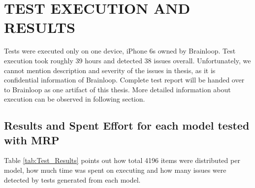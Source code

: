\chapter{TEST EXECUTION AND RESULTS}
\label{chapter:testing_results}

Tests were executed only on one device, iPhone 6s owned by Brainloop. Test execution took roughly 39 hours and detected 38 issues overall. Unfortunately, we cannot mention description and severity of the issues in thesis, as it is confidential information of Brainloop. Complete test report will be handed over to Brainloop as one artifact of this thesis. More detailed information about execution can be observed in following section.


\section{Results and Spent Effort for each model tested with MRP}
Table \ref{tab:Test_Results} points out how total 4196 items were distributed per model, how much time was spent on executing and how many issues were detected by tests generated from each model.

